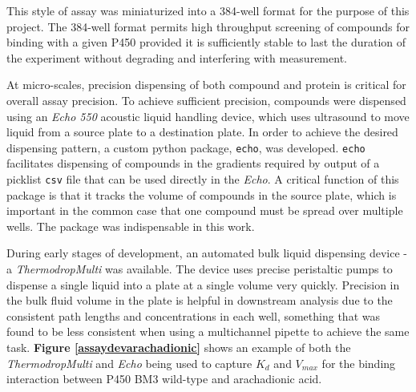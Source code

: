 \documentclass[16pt]{book}
\begin{document}
This style of assay was miniaturized into a 384-well format for the purpose of this project.
The 384-well format permits high throughput screening of compounds for binding with a given P450 provided it is sufficiently stable to last the duration of the experiment without degrading and interfering with measurement.

At micro-scales, precision dispensing of both compound and protein is critical for overall assay precision.
To achieve sufficient precision, compounds were dispensed using an \textit{Echo 550} acoustic liquid handling device, which uses ultrasound to move liquid from a source plate to a destination plate.
In order to achieve the desired dispensing pattern, a custom python package, \texttt{echo}, was developed.
\texttt{echo} facilitates dispensing of compounds in the gradients required by output of a picklist \texttt{csv} file that can be used directly in the \textit{Echo}.
A critical function of this package is that it tracks the volume of compounds in the source plate, which is important in the common case that one compound must be spread over multiple wells.
The package was indispensable in this work.


During early stages of development, an automated bulk liquid dispensing device - a \textit{ThermodropMulti} was available.
The device uses precise peristaltic pumps to dispense a single liquid into a plate at a single volume very quickly.
Precision in the bulk fluid volume in the plate is helpful in downstream analysis due to the consistent path lengths and concentrations in each well, something that was found to be less consistent when using a multichannel pipette to achieve the same task.
\textbf{Figure \ref{assaydevarachadionic}} shows an example of both the \textit{ThermodropMulti} and \textit{Echo} being used to capture $K_d$ and $V_{max}$ for the binding interaction between P450 BM3 wild-type and arachadionic acid.
\end{document}
